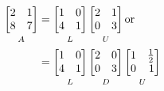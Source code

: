 \documentclass[../main.tex]{subfiles}
\begin{document}
{\[
\begin{aligned}
\underbracket[0pt][0pt]{
\begin{bmatrix*}[r]
2 & 1 \\
8 & 7
\end{bmatrix*}
}_{\mathstrut A}
&=
\underbracket[0pt][0pt]{
\begin{bmatrix*}[r]
1 & 0 \\
4 & 1
\end{bmatrix*}
}_{\mathstrut L}
\underbracket[0pt][0pt]{
\begin{bmatrix*}[r]
2 & 1 \\
0 & 3
\end{bmatrix*}
}_{\mathstrut U}
\text{or} \\
&
=
\underbracket[0pt][0pt]{
\begin{bmatrix*}[r]
1 & 0 \\
4 & 1
\end{bmatrix*}
}_{\mathstrut L}
\underbracket[0pt][0pt]{
\begin{bmatrix*}[r]
2 & 0 \\ 
0 & 3
\end{bmatrix*}
}_{\mathstrut D}
\underbracket[0pt][0pt]{
\begin{bmatrix*}[r]
1 & \frac{1}{2} \\
0 & 1
\end{bmatrix*}
}_{\mathstrut U}
\end{aligned}
\]
}
\end{document}
